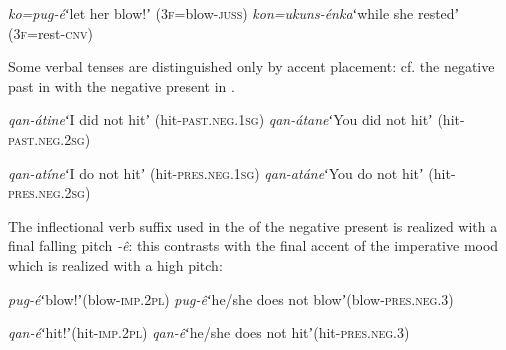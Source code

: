 \documentclass[output=paper]{LSP/langsci}
\begin{document}
\begin{exe}
\ex \begin{xlist}
\ex \textit{ko=pug-é}\hspace{11mm}ʻlet her blow!ʼ (3\textsc{f}=blow-\textsc{juss}) \label{ex:Petrollino:kopugé}
\ex \textit{kon=ukuns-énka}\hspace{1mm}ʻwhile she restedʼ (3\textsc{f}=rest-\textsc{cnv}) \label{ex:Petrollino:konuskenka}
\end{xlist}
\end{exe}
Some verbal tenses are distinguished only by accent placement: cf. the negative past in  with the negative present in . 
\begin{exe}
\ex \begin{xlist}
\ex \textit{qan-átine}\hspace{8mm}ʻI did not hitʼ (hit-\textsc{past}.\textsc{neg}.1\textsc{sg}) 
\ex \textit{qan-átane}\hspace{8mm}ʻYou did not hitʼ (hit-\textsc{past}.\textsc{neg}.2\textsc{sg})
\end{xlist}\label{ex:Petrollino:NEGPast}
\end{exe} 
\begin{exe}
\ex \begin{xlist}
\ex \textit{qan-atíne}\hspace{8mm}ʻI do not hitʼ (hit-\textsc{pres}.\textsc{neg}.1\textsc{sg}) 
\ex \textit{qan-atáne}\hspace{8mm}ʻYou do not hitʼ (hit-\textsc{pres}.\textsc{neg}.2\textsc{sg}) 
\end{xlist}\label{ex:Petrollino:NEGPres}
\end{exe} 
The inflectional verb suffix used in the  of the negative present is realized with a final falling pitch \textit{-ê}: this contrasts with the final accent of the imperative mood which is realized with a high pitch:
\begin{exe}
\ex \begin{xlist} \label{ex:Petrollino:IMPNEG}
\ex \textit{pug-é}\hspace{15mm}ʻblow!ʼ\hspace{40mm}(blow-\textsc{imp}.2\textsc{pl})
\ex \textit{pug-ê}\hspace{15mm}ʻhe/she does not blowʼ\hspace{16mm}(blow-\textsc{pres}.\textsc{neg}.3)
\end{xlist}
\end{exe}
\begin{exe}
\ex \begin{xlist}
\ex \textit{qan-é}\hspace{15mm}ʻhit!ʼ\hspace{44mm}(hit-\textsc{imp}.2\textsc{pl})
\ex \textit{qan-ê}\hspace{15mm}ʻhe/she does not hitʼ\hspace{20mm}(hit-\textsc{pres}.\textsc{neg}.3)
\end{xlist}
\end{exe}
\end{document}
